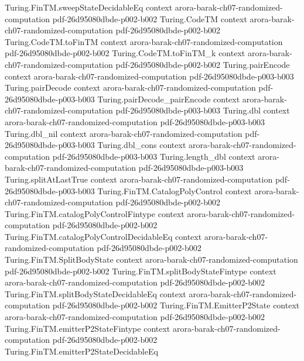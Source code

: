 \begin{theorem}
\proofstep
  {Turing.FinTM.sweepStateDecidableEq}
  {context}
  {arora-barak-ch07-randomized-computation}
  {pdf-26d95080dbde-p002-b002}
\proofstep
  {Turing.CodeTM}
  {context}
  {arora-barak-ch07-randomized-computation}
  {pdf-26d95080dbde-p002-b002}
\proofstep
  {Turing.CodeTM.toFinTM}
  {context}
  {arora-barak-ch07-randomized-computation}
  {pdf-26d95080dbde-p002-b002}
\proofstep
  {Turing.CodeTM.toFinTM_k}
  {context}
  {arora-barak-ch07-randomized-computation}
  {pdf-26d95080dbde-p002-b002}
\proofstep
  {Turing.pairEncode}
  {context}
  {arora-barak-ch07-randomized-computation}
  {pdf-26d95080dbde-p003-b003}
\proofstep
  {Turing.pairDecode}
  {context}
  {arora-barak-ch07-randomized-computation}
  {pdf-26d95080dbde-p003-b003}
\proofstep
  {Turing.pairDecode_pairEncode}
  {context}
  {arora-barak-ch07-randomized-computation}
  {pdf-26d95080dbde-p003-b003}
\proofstep
  {Turing.dbl}
  {context}
  {arora-barak-ch07-randomized-computation}
  {pdf-26d95080dbde-p003-b003}
\proofstep
  {Turing.dbl_nil}
  {context}
  {arora-barak-ch07-randomized-computation}
  {pdf-26d95080dbde-p003-b003}
\proofstep
  {Turing.dbl_cons}
  {context}
  {arora-barak-ch07-randomized-computation}
  {pdf-26d95080dbde-p003-b003}
\proofstep
  {Turing.length_dbl}
  {context}
  {arora-barak-ch07-randomized-computation}
  {pdf-26d95080dbde-p003-b003}
\proofstep
  {Turing.splitAtLastTrue}
  {context}
  {arora-barak-ch07-randomized-computation}
  {pdf-26d95080dbde-p003-b003}
\proofstep
  {Turing.FinTM.CatalogPolyControl}
  {context}
  {arora-barak-ch07-randomized-computation}
  {pdf-26d95080dbde-p002-b002}
\proofstep
  {Turing.FinTM.catalogPolyControlFintype}
  {context}
  {arora-barak-ch07-randomized-computation}
  {pdf-26d95080dbde-p002-b002}
\proofstep
  {Turing.FinTM.catalogPolyControlDecidableEq}
  {context}
  {arora-barak-ch07-randomized-computation}
  {pdf-26d95080dbde-p002-b002}
\proofstep
  {Turing.FinTM.SplitBodyState}
  {context}
  {arora-barak-ch07-randomized-computation}
  {pdf-26d95080dbde-p002-b002}
\proofstep
  {Turing.FinTM.splitBodyStateFintype}
  {context}
  {arora-barak-ch07-randomized-computation}
  {pdf-26d95080dbde-p002-b002}
\proofstep
  {Turing.FinTM.splitBodyStateDecidableEq}
  {context}
  {arora-barak-ch07-randomized-computation}
  {pdf-26d95080dbde-p002-b002}
\proofstep
  {Turing.FinTM.EmitterP2State}
  {context}
  {arora-barak-ch07-randomized-computation}
  {pdf-26d95080dbde-p002-b002}
\proofstep
  {Turing.FinTM.emitterP2StateFintype}
  {context}
  {arora-barak-ch07-randomized-computation}
  {pdf-26d95080dbde-p002-b002}
\proofstep
  {Turing.FinTM.emitterP2StateDecidableEq}

\end{theorem}
